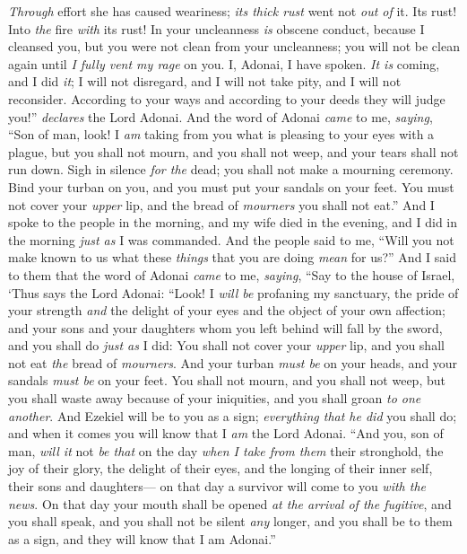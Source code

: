 \begin{biblechapter}
\verse \textit{Through} effort she has caused weariness; \textit{its thick rust} went not \textit{out of} it. Its rust! Into \textit{the} fire \textit{with} its rust!
\verse In your uncleanness \textit{is} obscene conduct, because I cleansed you, but you were not clean from your uncleanness; you will not be clean again until \textit{I fully vent my rage} on you.
\verse I, Adonai, I have spoken. \textit{It is} coming, and I did \textit{it}; I will not disregard, and I will not take pity, and I will not reconsider. According to your ways and according to your deeds they will judge you!” \textit{declares} the Lord Adonai.
\verse And the word of Adonai \textit{came} to me, \textit{saying},
\verse “Son of man, look! I \textit{am} taking from you what is pleasing to your eyes with a plague, but you shall not mourn, and you shall not weep, and your tears shall not run down.
\verse Sigh in silence \textit{for the} dead; you shall not make a mourning ceremony. Bind your turban on you, and you must put your sandals on your feet. You must not cover your \textit{upper} lip, and the bread of \textit{mourners} you shall not eat.”
\verse And I spoke to the people in the morning, and my wife died in the evening, and I did in the morning \textit{just as} I was commanded.
\verse And the people said to me, “Will you not make known to us what these \textit{things} that you are doing \textit{mean} for us?”
\verse And I said to them that the word of Adonai \textit{came} to me, \textit{saying},
\verse “Say to the house of Israel, ‘Thus says the Lord Adonai: “Look! I \textit{will be} profaning my sanctuary, the pride of your strength \textit{and} the delight of your eyes and the object of your own affection; and your sons and your daughters whom you left behind will fall by the sword,
\verse and you shall do \textit{just as} I did: You shall not cover your \textit{upper} lip, and you shall not eat \textit{the} bread of \textit{mourners}.
\verse And your turban \textit{must be} on your heads, and your sandals \textit{must be} on your feet. You shall not mourn, and you shall not weep, but you shall waste away because of your iniquities, and you shall groan \textit{to one another}.
\verse And Ezekiel will be to you as a sign; \textit{everything that he did} you shall do; and when it comes you will know that I \textit{am} the Lord Adonai.
\verse “And you, son of man, \textit{will it} not \textit{be that} on the day \textit{when I take from them} their stronghold, the joy of their glory, the delight of their eyes, and the longing of their inner self, their sons and daughters—
\verse on that day a survivor will come to you \textit{with the news}.
\verse On that day your mouth shall be opened \textit{at the arrival of the fugitive}, and you shall speak, and you shall not be silent \textit{any} longer, and you shall be to them as a sign, and they will know that I am Adonai.”
\end{biblechapter}

